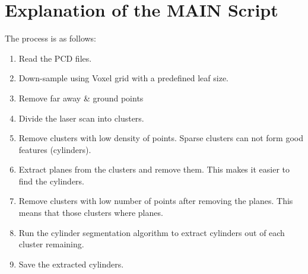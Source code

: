 \documentclass[twoside]{article}
\begin{document}
\section{Explanation of the MAIN Script}
The process is as follows:
\begin{enumerate}
	\item Read the PCD files.
	\item Down-sample using Voxel grid with a predefined leaf size.
	\item Remove far away \& ground points
	\item Divide the laser scan into clusters.
	\item Remove clusters with low density of points. Sparse clusters can not form good features (cylinders).
	\item Extract planes from the clusters and remove them. This makes it easier to find the cylinders.
	\item Remove clusters with low number of points after removing the planes. This means that those clusters where planes.
	\item Run the cylinder segmentation algorithm to extract cylinders out of each cluster remaining.
	\item Save the extracted cylinders.
\end{enumerate}
\end{document}
